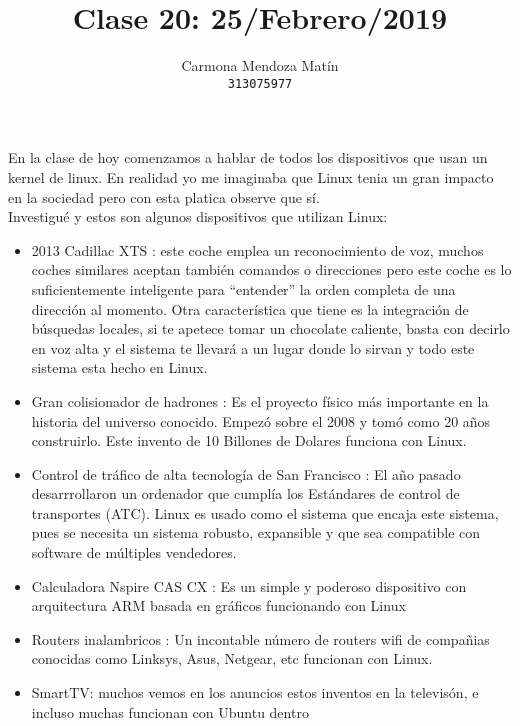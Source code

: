 \documentclass[11pt, a4paper]{report}
\begin{document}
\title{Clase 20: 25/Febrero/2019}
\author{
  Carmona Mendoza Mat\'in\\
  \texttt{313075977}
}
\date{}
\maketitle

En la clase de hoy comenzamos a hablar de todos los dispositivos que usan un
kernel de linux. En realidad yo me imaginaba que Linux tenia un gran impacto
en la sociedad pero con esta platica observe que sí. \\

Investigué y estos son algunos dispositivos que utilizan Linux:

\begin{itemize}
\item  2013 Cadillac XTS : este coche emplea un reconocimiento de voz, muchos
  coches similares aceptan también comandos o direcciones pero este coche es
  lo suficientemente inteligente para “entender” la orden completa de una
  dirección al momento. Otra característica que tiene es la integración de
  búsquedas locales, si te apetece tomar un chocolate caliente, basta con
  decirlo en voz alta y el sistema te llevará a un lugar donde lo sirvan y
  todo este sistema esta hecho en Linux. 
\item Gran colisionador de hadrones : Es el proyecto físico más importante en
  la historia del universo conocido. Empezó sobre el 2008 y tomó como 20 años
  construirlo. Este invento de 10 Billones de Dolares funciona con Linux.
\item Control de tráfico de alta tecnología de San Francisco : El año pasado
  desarrrollaron un ordenador que cumplía los Estándares de control de
  transportes (ATC). Linux es usado como el sistema que encaja este sistema,
  pues se necesita un sistema robusto, expansible y que sea compatible con
  software de múltiples vendedores.
\item Calculadora Nspire CAS CX : Es un simple y poderoso dispositivo con
  arquitectura ARM basada en gráficos funcionando con Linux
\item Routers inalambricos : Un incontable número de routers wifi de compañias
  conocidas como Linksys, Asus, Netgear, etc funcionan con Linux.
\item SmartTV: muchos vemos en los anuncios estos inventos en la televisón, e
  incluso muchas funcionan con Ubuntu dentro
\end{itemize}
\end{document}
